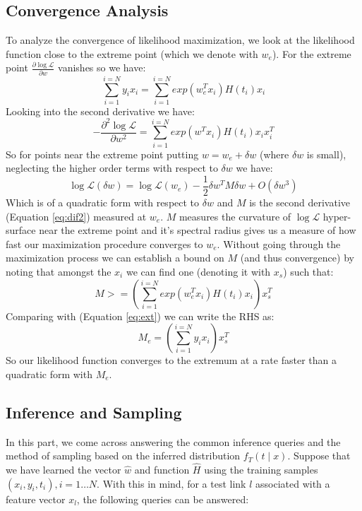 \subsection{Convergence Analysis}
To analyze the convergence of likelihood maximization, we look at the likelihood function close to the extreme point (which we denote with $w_e$). For the extreme point $\frac{\partial \log \mathcal{L}}{\partial w}$ vanishes so we have: 
\begin{equation}\label{eq:ext}
\sum_{i=1}^{i=N} y_ix_i=\sum_{i=1}^{i=N} exp(w_e^Tx_i)H(t_i)x_i
\end{equation}
Looking into the second derivative we have:
\begin{equation}\label{eq:dif2}
-\frac{\partial^2 \log \mathcal {L}}{\partial w^2}=\sum_{i=1}^{i=N} exp(w^Tx_i)H(t_i)x_ix_i^T
\end{equation}
So for points near the extreme point putting $w=w_e+\delta w$ (where $\delta w$ is small), neglecting the higher order terms with respect to $\delta w$ we have:
\begin{equation}
\log \mathcal{L}(\delta w)=\log \mathcal{L}(w_e)-\frac{1}{2}\delta w^TM\delta w + O(\delta w^3)
\end{equation}
Which is of a quadratic form with respect to $\delta w$ and $M$ is the second derivative (Equation \ref{eq:dif2}) measured at $w_e$. $M$ measures the curvature of $\log \mathcal{L}$ hyper-surface near the extreme point and it's spectral radius gives us a measure of how fast our maximization procedure converges to $w_e$. 
Without going through the maximization process we can establish a bound on $M$ (and thus convergence) by noting that amongst the $x_i$ we can find one (denoting it with $x_s$) such that:
\begin{equation}
M>=(\sum_{i=1}^{i=N} exp(w_e^Tx_i)H(t_i)x_i) x_s^T
\end{equation}
Comparing with (Equation \ref{eq:ext}) we can write the RHS as:
\begin{equation}
M_e=(\sum_{i=1}^{i=N} y_ix_i) x_s^T
\end{equation}
So our likelihood function converges to the extremum at a rate faster than a quadratic form with $M_e$.


\subsection{Inference and Sampling}
In this part, we come across answering the common inference queries and the method of sampling based on the inferred distribution $f_T(t\mid x)$. Suppose that we have learned the vector $\hat{w}$ and function $\hat{H}$ using the training samples $(x_i, y_i, t_i), i=1\dots N$. With this in mind, for a test link $l$ associated with a feature vector $x_l$, the following queries can be answered:\\


